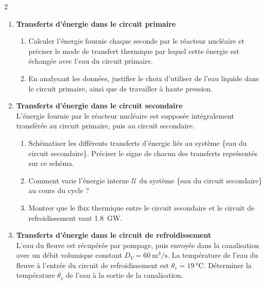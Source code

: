 \documentclass[a4paper,11pt,fleqn]{article}%
\begin{document}
\begin{multicols}{2}
\begin{enumerate}
	\item \textbf{Transferts d'énergie dans le circuit primaire}
	\begin{enumerate}
		\item Calculer l'énergie fournie chaque seconde par le réacteur nucléaire et préciser le mode de transfert thermique par lequel cette énergie est échangée avec l'eau du circuit primaire.
		\item En analysant les données, justifier le choix d'utiliser de l'eau liquide dans le circuit primaire, ainsi que de travailler à haute pression.		
	\end{enumerate}
	\item \textbf{Transferts d'énergie dans le circuit secondaire}\\
	L'énergie fournie par le réacteur nucléaire est supposée intégralement transférée au circuit primaire, puis au circuit secondaire.
	\begin{enumerate}
		\item  Schématiser les différents transferts d'énergie liés au système \{eau du circuit secondaire\}. Préciser le signe de chacun des transferts représentés sur ce schéma.
		\item Comment varie l'énergie interne $\mathcal{U}$ du système \{eau du circuit secondaire\} au cours du cycle ?
		\item Montrer que le flux thermique entre le circuit secondaire et le circuit de refroidissement vaut \SI{1,8}{\giga\watt}.
	\end{enumerate}
	\item \textbf{Transferts d'énergie dans le circuit de refroidissement}\\
	L'eau du fleuve est récupérée par pompage, puis envoyée dans la canalisation avec un débit volumique constant $D_V = \SI{60}{\meter\cubed\per\second}$. La température de l'eau du fleuve à l'entrée du circuit de refroidissement est $\theta_e=\SI{19}{\celsius}$. Déterminer la température $\theta_s$ de l'eau à la sortie de la canalisation. 
\end{enumerate}


\end{multicols}
\end{document}
